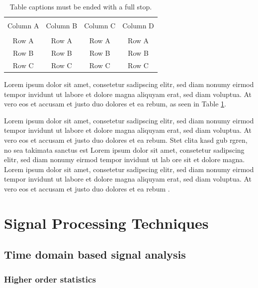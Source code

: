 \begin{table}[h]
	{\setlength{\tabcolsep}{14pt}
		\caption{Table captions must be ended with a full stop.}
		\begin{center}
			\vspace{-6mm}
			\begin{tabular}{cccc}
				\hline \\[-2.45ex] \hline \\[-2.1ex]
				Column A & Column B & Column C & Column D \\
				\hline \\[-1.8ex]
				Row A & Row A & Row A & Row A \\
				Row B & Row B & Row B & Row B \\
				Row C & Row C & Row C & Row C \\
				\hline
			\end{tabular}
			\vspace{-6mm}
		\end{center}
		\label{Table2.2}}
\end{table}

Lorem ipsum dolor sit amet, consetetur sadipscing elitr, sed diam nonumy eirmod tempor invidunt ut labore et dolore magna aliquyam erat, sed diam voluptua. At vero eos et accusam et justo duo dolores et ea rebum, as seen in Table \ref{Table2.2}. 

Lorem ipsum dolor sit amet, consetetur sadipscing elitr, sed diam nonumy eirmod tempor invidunt ut labore et dolore magna aliquyam erat, sed diam voluptua. At vero eos et accusam et justo duo dolores et ea rebum. Stet clita kasd gub rgren, no sea takimata sanctus est Lorem ipsum dolor sit amet, consetetur sadipscing elitr, sed diam nonumy eirmod tempor invidunt ut lab ore sit et dolore magna. Lorem ipsum dolor sit amet, consetetur sadipscing elitr, sed diam nonumy eirmod tempor invidunt ut labore et dolore magna aliquyam erat, sed diam voluptua. At vero eos et accusam et justo duo dolores et ea rebum \cite{Roberts_Jackson_1991}. 

\section{Signal Processing Techniques}
\subsection{Time domain based signal analysis}
\subsubsection{Higher order statistics}

